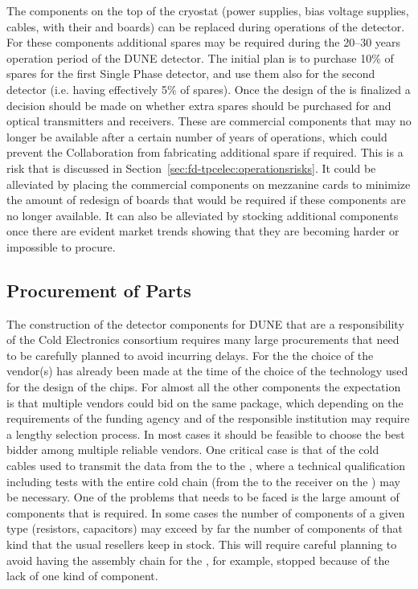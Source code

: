The components on the top of the cryostat (power supplies, bias
voltage supplies, cables,  with their 
and  boards) can be replaced during operations of the
detector. For these components additional spares may be required
during the 20--30 years operation period of the DUNE detector.
The initial plan is to purchase 10\% of spares for the first
Single  Phase detector, and use them also for the second detector
(i.e. having effectively 5\% of spares). Once the design of
the  is finalized a decision should be made on whether
extra spares should be purchased for  and optical
transmitters and receivers. These are commercial components 
that may no longer be available after a certain number of 
years of operations, which could prevent the Collaboration from
fabricating additional spare  if required. This
is a risk that is discussed in Section~\ref{sec:fd-tpcelec:operationsrisks}.
It could be alleviated by placing the commercial components
on mezzanine cards to minimize the amount of redesign of
boards that would be required if these components are no longer available.
It can also be alleviated by stocking additional components
once there are evident market trends showing that they are 
becoming harder or impossible to procure.

\subsection{Procurement of Parts}
\label{sec:fdsp-tpcelec-production-procurement}

The construction of the detector components for DUNE that are a
responsibility of the Cold Electronics consortium requires many
large procurements that need to be carefully planned to avoid
incurring delays. For the  the choice of the vendor(s)
has already been made at the time of the choice of the technology
used for the design of the chips. For almost all the other components
the expectation is that multiple vendors could bid on the same 
package, which depending on the requirements of the funding
agency and of the responsible institution may require a lengthy
selection process. In most cases it should be feasible to choose
the best bidder among multiple reliable vendors. One critical case
is that of the cold cables used to transmit the data from the
 to the , where a technical qualification
including tests with the entire cold chain (from the 
to the receiver on the ) may be necessary. One of the
problems that needs to be faced is the large amount of components
that is required. In some cases the number of components of a given
type (resistors, capacitors) may exceed by far the number of components
of that kind that the usual resellers keep in stock. This will 
require careful planning to avoid having the assembly chain for
the , for example, stopped because of the lack of
one kind of component.

